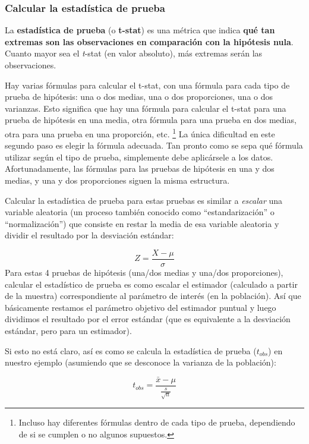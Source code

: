 \documentclass[
]{book}
\begin{document}
\hypertarget{calcular-la-estaduxedstica-de-prueba}{%
\subsubsection{Calcular la estadística de prueba}\label{calcular-la-estaduxedstica-de-prueba}}

La \textbf{estadística de prueba} (o \textbf{t-stat}) es una métrica que indica \textbf{qué tan extremas son las observaciones en comparación con la hipótesis nula}. Cuanto mayor sea el \emph{t}-stat (en valor absoluto), más extremas serán las observaciones.

Hay varias fórmulas para calcular el t-stat, con una fórmula para cada tipo de prueba de hipótesis: una o dos medias, una o dos proporciones, una o dos varianzas. Esto significa que hay una fórmula para calcular el t-stat para una prueba de hipótesis en una media, otra fórmula para una prueba en dos medias, otra para una prueba en una proporción, etc. \footnote{Incluso hay diferentes fórmulas dentro de cada tipo de prueba, dependiendo de si se cumplen o no algunos supuestos.} La única dificultad en este segundo paso es elegir la fórmula adecuada. Tan pronto como se sepa qué fórmula utilizar según el tipo de prueba, simplemente debe aplicársele a los datos. Afortunadamente, las fórmulas para las pruebas de hipótesis en una y dos medias, y una y dos proporciones siguen la misma estructura.

Calcular la estadística de prueba para estas pruebas es similar a \emph{escalar} una variable aleatoria (un proceso también conocido como ``estandarización'' o ``normalización'') que consiste en restar la media de esa variable aleatoria y dividir el resultado por la desviación estándar:

\[Z = \frac{X - \mu}{\sigma}\]
Para estas 4 pruebas de hipótesis (una/dos medias y una/dos proporciones), calcular el estadístico de prueba es como escalar el estimador (calculado a partir de la muestra) correspondiente al parámetro de interés (en la población). Así que básicamente restamos el parámetro objetivo del estimador puntual y luego dividimos el resultado por el error estándar (que es equivalente a la desviación estándar, pero para un estimador).

Si esto no está claro, así es como se calcula la estadística de prueba (\(t_{obs}\)) en nuestro ejemplo (asumiendo que se desconoce la varianza de la población):

\[t_{obs} = \frac{\bar{x} - \mu}{\frac{s}{\sqrt{n}}}\]
\end{document}
